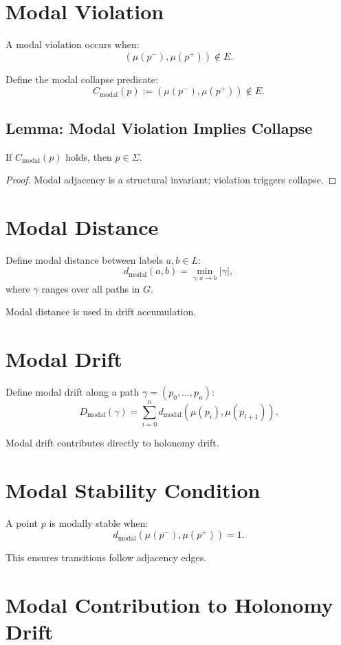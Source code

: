 \documentclass[11pt]{article}
\begin{document}
\section{Modal Violation}

A modal violation occurs when:
\[
(\mu(p^-), \mu(p^+)) \notin E.
\]

Define the modal collapse predicate:
\[
C_{\mathrm{modal}}(p)
  := (\mu(p^-), \mu(p^+)) \notin E.
\]

\subsection{Lemma: Modal Violation Implies Collapse}
If $C_{\mathrm{modal}}(p)$ holds, then $p \in \Sigma$.

\begin{proof}
Modal adjacency is a structural invariant; violation triggers collapse.
\end{proof}

\section{Modal Distance}

Define modal distance between labels $a,b \in L$:
\[
d_{\mathrm{modal}}(a,b)
  = \min_{\gamma : a \to b}
      |\gamma|,
\]
where $\gamma$ ranges over all paths in $G$.

Modal distance is used in drift accumulation.

\section{Modal Drift}

Define modal drift along a path $\gamma = (p_0, \ldots, p_n)$:
\[
D_{\mathrm{modal}}(\gamma)
  = \sum_{i=0}^{n}
      d_{\mathrm{modal}}(\mu(p_i), \mu(p_{i+1})).
\]

Modal drift contributes directly to holonomy drift.

\section{Modal Stability Condition}

A point $p$ is modally stable when:
\[
d_{\mathrm{modal}}(\mu(p^-), \mu(p^+)) = 1.
\]

This ensures transitions follow adjacency edges.

\section{Modal Contribution to Holonomy Drift}
\end{document}
